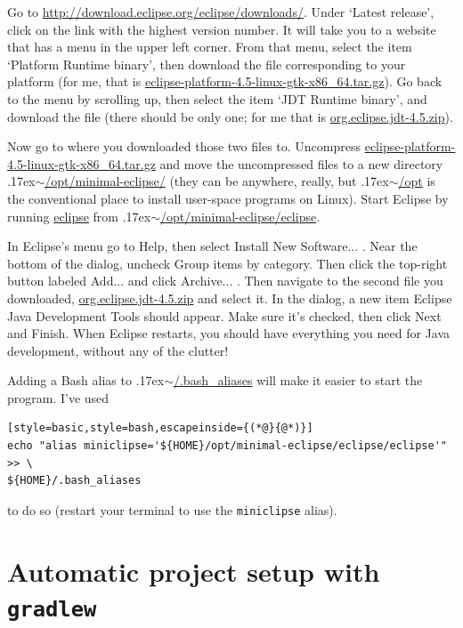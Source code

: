 \documentclass[12pt, a4paper, twoside, openany, titlepage]{book}
\newcommand{\mytilde}{\raise.17ex\hbox{$\scriptstyle\sim$}}
\begin{document}
Go to \url{http://download.eclipse.org/eclipse/downloads/}. Under `Latest release', click on the link with the highest version number. It will take you to a website that has a menu in the upper left corner. From that menu, select the item `Platform Runtime binary', then download the file corresponding to your platform (for me, that is \url{eclipse-platform-4.5-linux-gtk-x86_64.tar.gz}). Go back to the menu by scrolling up, then select the item `JDT Runtime binary', and download the file (there should be only one; for me that is \url{org.eclipse.jdt-4.5.zip}).

Now go to where you downloaded those two files to. Uncompress \url{eclipse-platform-4.5-linux-gtk-x86_64.tar.gz} and move the uncompressed files to a new directory \mytilde\url{/opt/minimal-eclipse/} (they can be anywhere, really, but \mytilde\url{/opt} is the conventional place to install user-space programs on Linux). Start Eclipse by running \url{eclipse} from \mytilde\url{/opt/minimal-eclipse/eclipse}.

In Eclipse's menu go to \textsf{Help}, then select \textsf{Install New Software...} . Near the bottom of the dialog, uncheck \textsf{Group items by category}. Then click the top-right button labeled \textsf{Add...} and click \textsf{Archive...} . Then navigate to the second file you downloaded, \url{org.eclipse.jdt-4.5.zip} and select it. In the dialog, a new item \textsf{Eclipse Java Development Tools} should appear. Make sure it's checked, then click \textsf{Next} and \textsf{Finish}. When Eclipse restarts, you should have everything you need for Java development, without any of the clutter!


Adding a Bash alias to \mytilde\url{/.bash_aliases} will make it easier to start the program. I've used
\begin{lstlisting}[style=basic,style=bash,escapeinside={(*@}{@*)}]
echo "alias miniclipse='${HOME}/opt/minimal-eclipse/eclipse/eclipse'" >> \
${HOME}/.bash_aliases
\end{lstlisting}
to do so (restart your terminal to use the \texttt{miniclipse} alias).

\section{Automatic project setup with \texttt{gradlew}}

\end{document}
